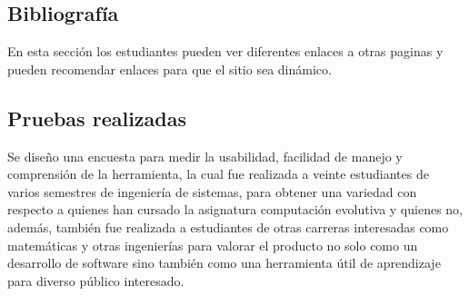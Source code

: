 \documentclass[letterpaper, 11pt, oneside]{article}
\theoremstyle{definition}
\theoremstyle{remark}
\begin{document}
\subsection{Bibliografía}

En esta sección los estudiantes pueden ver diferentes enlaces a otras paginas y pueden recomendar enlaces para que el sitio sea dinámico.
\clearpage
\newpage
\subsection{Pruebas realizadas}

Se diseño una encuesta para medir la usabilidad, facilidad de manejo y comprensión de la herramienta, la cual fue realizada a veinte estudiantes de varios semestres de ingeniería de sistemas, para obtener una variedad con respecto a quienes han cursado la asignatura computación evolutiva y quienes no, además, también fue realizada a estudiantes de otras carreras interesadas como matemáticas y otras ingenierías para valorar el producto no solo como un desarrollo de software sino también como una herramienta útil de aprendizaje para diverso público interesado. \\
\end{document}

